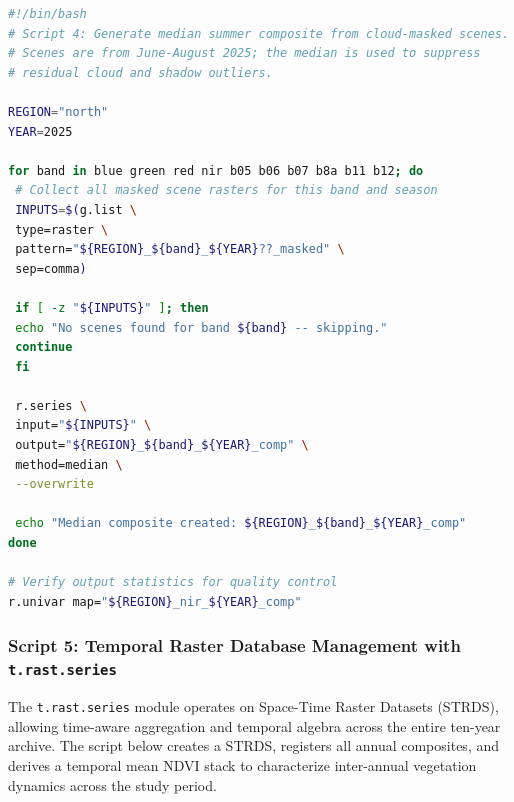 \documentclass[coasts,article,submit,pdftex,moreauthors]{Definitions/mdpi}
\begin{document}
\begin{lstlisting}[language=bash, caption={Median summer compositing of Sentinel-2 scenes using \texttt{r.series}.}, label={lst:rseries}]
#!/bin/bash
# Script 4: Generate median summer composite from cloud-masked scenes.
# Scenes are from June-August 2025; the median is used to suppress
# residual cloud and shadow outliers.

REGION="north"
YEAR=2025

for band in blue green red nir b05 b06 b07 b8a b11 b12; do
 # Collect all masked scene rasters for this band and season
 INPUTS=$(g.list \
 type=raster \
 pattern="${REGION}_${band}_${YEAR}??_masked" \
 sep=comma)

 if [ -z "${INPUTS}" ]; then
 echo "No scenes found for band ${band} -- skipping."
 continue
 fi

 r.series \
 input="${INPUTS}" \
 output="${REGION}_${band}_${YEAR}_comp" \
 method=median \
 --overwrite

 echo "Median composite created: ${REGION}_${band}_${YEAR}_comp"
done

# Verify output statistics for quality control
r.univar map="${REGION}_nir_${YEAR}_comp"
\end{lstlisting}

\subsubsection*{Script 5: Temporal Raster Database Management with \texttt{t.rast.series}}

The \texttt{t.rast.series} module operates on Space-Time Raster Datasets (STRDS), allowing time-aware aggregation and temporal algebra across the entire ten-year archive. The script below creates a STRDS, registers all annual composites, and derives a temporal mean NDVI stack to characterize inter-annual vegetation dynamics across the study period.
\end{document}
